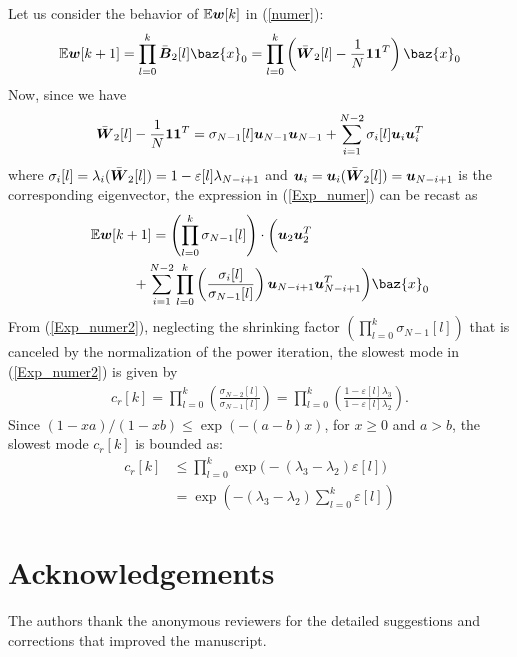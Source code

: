 \documentclass[10pt,twocolumn]{IEEEtran}
\def\bB{\mbox{\boldmath $B$}}
\def\bW{\mbox{\boldmath $W$}}
\def\bu{\mbox{\boldmath $u$}}
\def\bw{\mbox{\boldmath $w$}}
\def\bx{\baz{x}}
\begin{document}
Let us consider the behavior of $\mathbb{E}\bw[k]$ in (\ref{numer}):
\begin{equation}\label{Exp_numer}
   \mathbb{E}\bw[k+1]=\prod_{l=0}^k\bar{\bB}_2[l]\bx_0=\prod_{l=0}^k\left(\bar{\bW}_2[l]-\frac{1}{N}\mathbf{11}^T\right)\bx_0
\end{equation}
Now, since we have
\begin{equation}\label{eigen}
  \bar{\bW}_2[l]-\frac{1}{N}\mathbf{11}^T=\sigma_{N-1}[l]\bu_{N-1}\bu_{N-1}+\sum_{i=1}^{N-2}\sigma_i[l]\bu_i\bu_i^T \nonumber
\end{equation}
where $\sigma_{i}[l]=\lambda_{i}(\bar{\bW}_2[l])=1-\varepsilon[l]\lambda_{N-i+1}$ and $\bu_{i}=\bu_i(\bar{\bW}_2[l])=\bu_{N-i+1}$ is the corresponding eigenvector, the expression in (\ref{Exp_numer}) can be recast as
\begin{align}\label{Exp_numer2}
& \mathbb{E}\bw[k+1]=\left(\prod_{l=0}^k\sigma_{N-1}[l]\right)\cdot\bigg(\bu_{2}\bu_{2}^T \nonumber\\
&\quad\quad\quad+\sum_{i=1}^{N-2}\prod_{l=0}^k\left(\frac{\sigma_i[l]}{\sigma_{N-1}[l]}\right)\bu_{N-i+1}\bu_{N-i+1}^T\bigg)\bx_0
\end{align}
From (\ref{Exp_numer2}), neglecting the shrinking factor $\left(\prod_{l=0}^k\sigma_{N-1}[l]\right)$ that is canceled by the normalization of the power iteration, the slowest mode in (\ref{Exp_numer2}) is given by
\begin{align}\label{slow_mode}
c_r[k]=\prod_{l=0}^k\left(\frac{\sigma_{N-2}[l]}{\sigma_{N-1}[l]}\right)=\prod_{l=0}^k\left(\frac{1-\varepsilon[l]\lambda_3}{1-\varepsilon[l]\lambda_2}\right).
\end{align}
Since $(1-xa)/(1-xb)\leq \exp(-(a-b)x)$, for $x\geq0$ and $a>b$, the slowest mode $c_r[k]$ is bounded as:
\begin{align}\label{conv_mean_part}
c_r[k]&\leq\prod_{l=0}^k\exp\Big(-(\lambda_3-\lambda_2)\varepsilon[l]\Big) \nonumber\\
&=\exp \left(-(\lambda_3-\lambda_2)\sum_{l=0}^k\varepsilon[l]\right)
\end{align}


\section*{Acknowledgements}

The authors thank the anonymous reviewers for the detailed suggestions and corrections that improved the manuscript.
\end{document}
